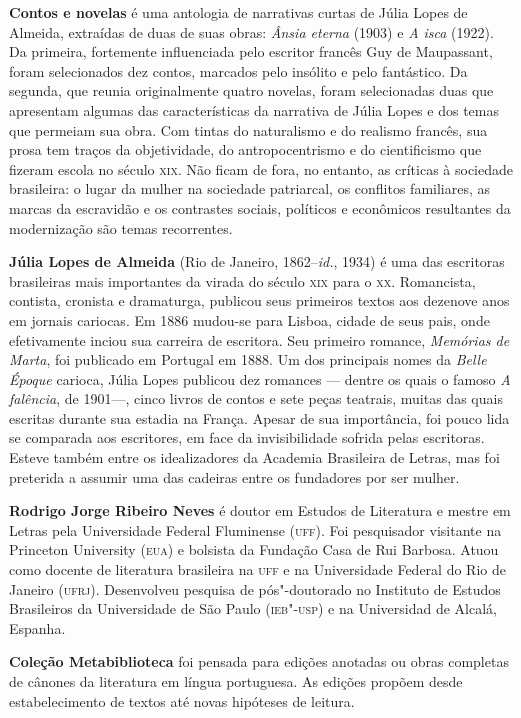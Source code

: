 \textbf{Contos e novelas} é uma antologia de narrativas
curtas de Júlia Lopes de Almeida, extraídas de duas de suas obras:
\emph{Ânsia eterna} (1903) e \emph{A isca} (1922). Da primeira, fortemente influenciada pelo escritor francês Guy de Maupassant, foram selecionados dez contos, marcados pelo insólito e pelo fantástico. Da segunda, que reunia originalmente quatro novelas, foram selecionadas duas
que apresentam algumas das características da narrativa de Júlia Lopes e dos temas que permeiam sua obra. Com tintas do naturalismo e do realismo francês, sua prosa tem traços da
objetividade, do antropocentrismo e do cientificismo que fizeram escola no século
\textsc{xix}. Não ficam de fora, no entanto, as críticas à sociedade brasileira:
o lugar da mulher na sociedade patriarcal, os conflitos familiares, as marcas da escravidão e os contrastes sociais, políticos e econômicos resultantes da modernização são temas recorrentes.

\textbf{Júlia Lopes de Almeida} (Rio de Janeiro, 1862--\textit{id.}, 1934) é uma das escritoras brasileiras mais importantes da virada do século \textsc{xix} para o \textsc{xx}.
Romancista, contista, cronista e dramaturga, publicou seus primeiros textos aos dezenove anos em jornais cariocas. Em 1886 mudou-se para Lisboa, cidade de seus pais, onde efetivamente inciou sua carreira de escritora. Seu primeiro romance, \textit{Memórias de Marta}, foi publicado em Portugal em 1888. Um dos principais nomes da \textit{Belle Époque}
carioca, Júlia Lopes publicou dez romances --- dentre os quais o famoso \textit{A falência}, de 1901---, cinco livros de contos e sete peças teatrais, muitas das quais escritas durante sua estadia na França.
Apesar de sua importância, foi pouco lida
se comparada aos escritores, em face da invisibilidade sofrida pelas
escritoras. Esteve também entre os idealizadores da Academia Brasileira de
Letras, mas foi preterida a assumir uma das cadeiras entre os fundadores
por ser mulher.

\textbf{Rodrigo Jorge Ribeiro Neves} é doutor em Estudos de Literatura e mestre em Letras pela Universidade Federal Fluminense (\textsc{uff}). Foi pesquisador visitante na Princeton University (\textsc{eua}) e bolsista da Fundação Casa de Rui Barbosa. Atuou como docente de literatura brasileira na \textsc{uff} e na Universidade Federal do Rio de Janeiro (\textsc{ufrj}). Desenvolveu pesquisa de pós"-doutorado no Instituto de Estudos Brasileiros da Universidade de São Paulo (\textsc{ieb"-usp}) e na Universidad de Alcalá, Espanha.

\textbf{Coleção Metabiblioteca} foi pensada para edições anotadas ou obras completas de cânones da literatura em língua portuguesa. As edições propõem desde estabelecimento de textos até novas hipóteses de leitura.

\endgroup
\pagebreak